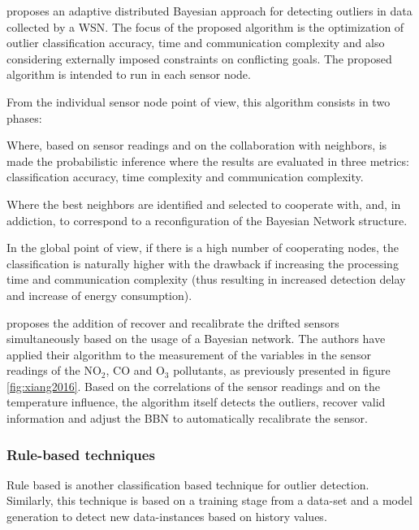 \cite{class:paola:2015} proposes an adaptive distributed Bayesian approach for detecting outliers in data collected by a WSN.
The focus of the proposed algorithm is the optimization of outlier classification accuracy, time and communication complexity and also considering externally imposed constraints on conflicting goals. The proposed algorithm is intended to run in each sensor node. 

From the individual sensor node point of view, this algorithm consists in two phases:

\begin{description}
	\setlength\itemsep{-0.5em}
	\item[Outlier detection]  
	Where, based on sensor readings and on the collaboration with neighbors, is made the probabilistic inference where the results are evaluated in three metrics: classification accuracy, time complexity and communication complexity.
	
	\item[Neighborhood selection] 
	Where the best neighbors are identified and selected to cooperate with, and, in addiction, to correspond to a reconfiguration of the Bayesian Network structure.
\end{description}

In the global point of view, if there is a high number of cooperating nodes, the classification is naturally higher with the drawback if increasing the processing time and communication complexity (thus resulting in increased detection delay and increase of energy consumption).

\cite{class:xiang:2016} proposes the addition of recover and recalibrate the drifted sensors simultaneously based on the usage of a Bayesian network. 
The authors have applied their algorithm to the measurement of the variables in the sensor readings of the NO$_2$, CO and O$_3$ pollutants, as previously presented in figure \ref{fig:xiang2016}.
Based on the correlations of the sensor readings and on the temperature influence, the algorithm itself detects the outliers, recover valid information and adjust the BBN to automatically recalibrate the sensor.




\subsubsection{Rule-based techniques}
\label{subsec:rule}
Rule based is another classification based technique for outlier detection. Similarly, this technique is based on a training stage from a data-set and a model generation to detect new data-instances based on history values.

